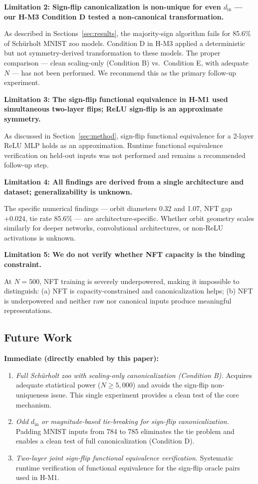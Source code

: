 \textbf{Limitation 2: Sign-flip canonicalization is non-unique for even $d_{\mathrm{in}}$ --- our H-M3 Condition D tested a non-canonical transformation.}

As described in Sections~\ref{sec:results}, the majority-sign algorithm fails for 85.6\% of Schürholt MNIST zoo models. Condition D in H-M3 applied a deterministic but not symmetry-derived transformation to these models. The proper comparison --- clean scaling-only (Condition B) vs.\ Condition E, with adequate $N$ --- has not been performed. We recommend this as the primary follow-up experiment.

\textbf{Limitation 3: The sign-flip functional equivalence in H-M1 used simultaneous two-layer flips; ReLU sign-flip is an approximate symmetry.}

As discussed in Section~\ref{sec:method}, sign-flip functional equivalence for a 2-layer ReLU MLP holds as an approximation. Runtime functional equivalence verification on held-out inputs was not performed and remains a recommended follow-up step.

\textbf{Limitation 4: All findings are derived from a single architecture and dataset; generalizability is unknown.}

The specific numerical findings --- orbit diameters 0.32 and 1.07, NFT gap $+0.024$, tie rate 85.6\% --- are architecture-specific. Whether orbit geometry scales similarly for deeper networks, convolutional architectures, or non-ReLU activations is unknown.

\textbf{Limitation 5: We do not verify whether NFT capacity is the binding constraint.}

At $N=500$, NFT training is severely underpowered, making it impossible to distinguish: (a) NFT is capacity-constrained and canonicalization helps; (b) NFT is underpowered and neither raw nor canonical inputs produce meaningful representations.

\subsection{Future Work}

\textbf{Immediate (directly enabled by this paper):}

\begin{enumerate}
\item \textit{Full Schürholt zoo with scaling-only canonicalization (Condition B).} Acquires adequate statistical power ($N \geq 5{,}000$) and avoids the sign-flip non-uniqueness issue. This single experiment provides a clean test of the core mechanism.

\item \textit{Odd $d_{\mathrm{in}}$ or magnitude-based tie-breaking for sign-flip canonicalization.} Padding MNIST inputs from 784 to 785 eliminates the tie problem and enables a clean test of full canonicalization (Condition D).

\item \textit{Two-layer joint sign-flip functional equivalence verification.} Systematic runtime verification of functional equivalence for the sign-flip oracle pairs used in H-M1.
\end{enumerate}

